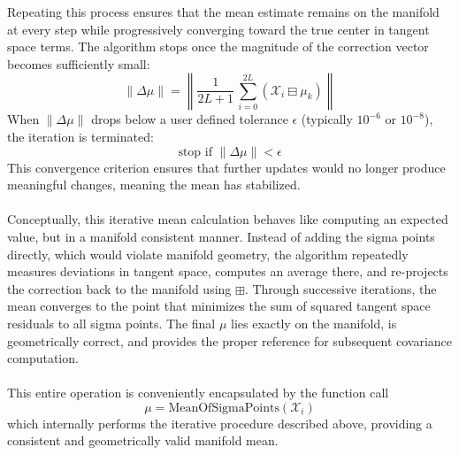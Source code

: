 Repeating this process ensures that the mean estimate remains on the manifold at every step while progressively converging toward the true center in tangent space terms. The algorithm stops once the magnitude of the correction vector becomes sufficiently small:
$$
    \|\Delta\mu\| = \left\| \frac{1}{2L + 1} \, \sum_{i=0}^{2L} (\mathcal{X}_i \boxminus \mu_k) \right\|
$$
When $\|\Delta\mu\|$ drops below a user defined tolerance $\epsilon$ (typically $10^{-6}$ or $10^{-8}$), the iteration is terminated:
$$
    \text{stop if } \|\Delta\mu\| < \epsilon
$$
This convergence criterion ensures that further updates would no longer produce meaningful changes, meaning the mean has stabilized.  
\\ \\
Conceptually, this iterative mean calculation behaves like computing an expected value, but in a manifold consistent manner. Instead of adding the sigma points directly, which would violate manifold geometry, the algorithm repeatedly measures deviations in tangent space, computes an average there, and re-projects the correction back to the manifold using $\boxplus$. Through successive iterations, the mean converges to the point that minimizes the sum of squared tangent space residuals to all sigma points. The final $\mu$ lies exactly on the manifold, is geometrically correct, and provides the proper reference for subsequent covariance computation.  
\\ \\
This entire operation is conveniently encapsulated by the function call
$$
    \mu = \text{MeanOfSigmaPoints}(\mathcal{X}_i)
$$
which internally performs the iterative procedure described above, providing a consistent and geometrically valid manifold mean.



